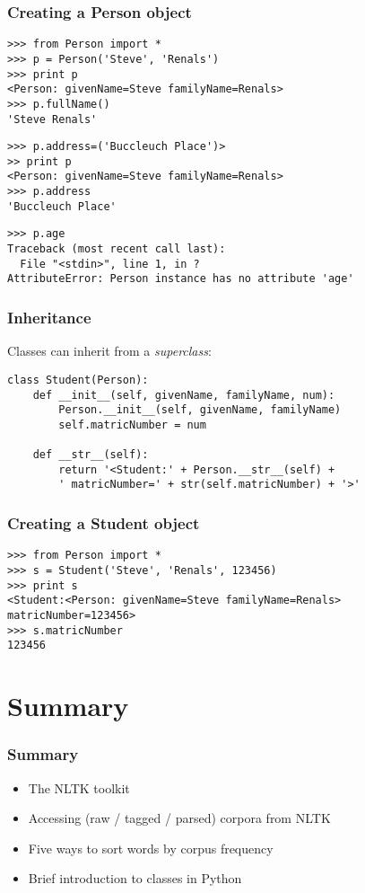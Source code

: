 \begin{frame}[fragile]
  \frametitle{Creating a Person object}
{\small
\begin{verbatim}
>>> from Person import *
>>> p = Person('Steve', 'Renals')
>>> print p
<Person: givenName=Steve familyName=Renals>
>>> p.fullName()
'Steve Renals'
\end{verbatim}
  \pause
\begin{verbatim}
>>> p.address=('Buccleuch Place')>
>> print p
<Person: givenName=Steve familyName=Renals>
>>> p.address  
'Buccleuch Place'
\end{verbatim}
  \pause
\begin{verbatim}
>>> p.age
Traceback (most recent call last):
  File "<stdin>", line 1, in ?
AttributeError: Person instance has no attribute 'age'
\end{verbatim}
}
\end{frame}

\begin{frame}[fragile]
  \frametitle{Inheritance}

  Classes can inherit from a \emph{superclass}:

\begin{verbatim}
class Student(Person):
    def __init__(self, givenName, familyName, num):
        Person.__init__(self, givenName, familyName)
        self.matricNumber = num

    def __str__(self):
        return '<Student:' + Person.__str__(self) + 
        ' matricNumber=' + str(self.matricNumber) + '>'
\end{verbatim}
  
\end{frame}

\begin{frame}[fragile]
  \frametitle{Creating a Student object}
\begin{verbatim}
>>> from Person import *
>>> s = Student('Steve', 'Renals', 123456)
>>> print s
<Student:<Person: givenName=Steve familyName=Renals> matricNumber=123456>
>>> s.matricNumber
123456
\end{verbatim}
\end{frame}

\section{Summary}

\begin{frame}
  \frametitle{Summary}

  \begin{itemize}
  \item The NLTK toolkit
  \item Accessing (raw / tagged / parsed) corpora from NLTK
  \item Five ways to sort words by corpus frequency
  \item Brief introduction to classes in Python
  \end{itemize}
\end{frame}



